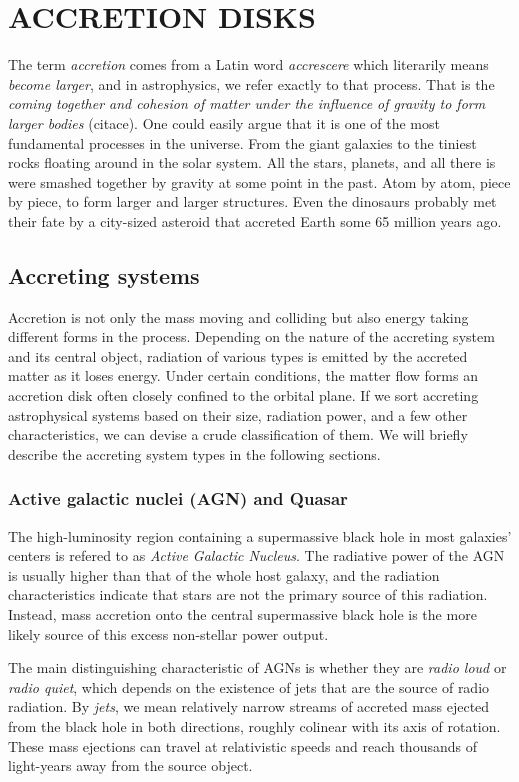\chapter{ACCRETION DISKS}
    \label{chap:accretion_disks}
    The term \emph{accretion} comes from a Latin word \emph{accrescere} which literarily means \emph{become larger}, and in astrophysics, we refer exactly to that process. That is the \emph{coming together and cohesion of matter under the influence of gravity to form larger bodies} (citace). One could easily argue that it is one of the most fundamental processes in the universe. From the giant galaxies to the tiniest rocks floating around in the solar system. All the stars, planets, and all there is were smashed together by gravity at some point in the past. Atom by atom, piece by piece, to form larger and larger structures. Even the dinosaurs probably met their fate by a city-sized asteroid that accreted Earth some 65 million years ago. 

\section{Accreting systems}
    Accretion is not only the mass moving and colliding but also energy taking different forms in the process. Depending on the nature of the accreting system and its central object, radiation of various types is emitted by the accreted matter as it loses energy. Under certain conditions, the matter flow forms an accretion disk often closely confined to the orbital plane. If we sort accreting astrophysical systems based on their size, radiation power, and a few other characteristics, we can devise a crude classification of them. We will briefly describe the accreting system types in the following sections. 

\subsection{Active galactic nuclei (AGN) and Quasar}
    The high-luminosity region containing a supermassive black hole in most galaxies' centers is refered to as \emph{Active Galactic Nucleus}. The radiative power of the AGN is usually higher than that of the whole host galaxy, and the radiation characteristics indicate that stars are not the primary source of this radiation. Instead, mass accretion onto the central supermassive black hole is the more likely source of this excess non-stellar power output. 

    The main distinguishing characteristic of AGNs is whether they are \emph{radio loud} or \emph{radio quiet}, which depends on the existence of jets that are the source of radio radiation. By \emph{jets}, we mean relatively narrow streams of accreted mass ejected from the black hole in both directions, roughly colinear with its axis of rotation. These mass ejections can travel at relativistic speeds and reach thousands of light-years away from the source object. 

